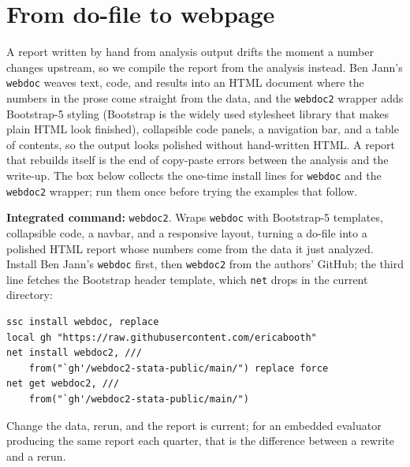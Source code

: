 \section{From do-file to webpage}
A report written by hand from analysis output drifts the moment a number changes upstream, so we compile the report from the analysis instead. Ben Jann's \texttt{webdoc} weaves text, code, and results into an HTML document where the numbers in the prose come straight from the data, and the \texttt{webdoc2} wrapper adds Bootstrap-5 styling (Bootstrap is the widely used stylesheet library that makes plain HTML look finished), collapsible code panels, a navigation bar, and a table of contents, so the output looks polished without hand-written HTML. A report that rebuilds itself is the end of copy-paste errors between the analysis and the write-up. The box below collects the one-time install lines for \texttt{webdoc} and the \texttt{webdoc2} wrapper; run them once before trying the examples that follow.

\begin{kaobox}[frametitle=Package Integration: \texttt{webdoc2}]
\textbf{Integrated command:} \texttt{webdoc2}. Wraps \texttt{webdoc} with Bootstrap-5 templates, collapsible code, a navbar, and a responsive layout, turning a do-file into a polished HTML report whose numbers come from the data it just analyzed. Install Ben Jann's \texttt{webdoc} first, then \texttt{webdoc2} from the authors' GitHub; the third line fetches the Bootstrap header template, which \texttt{net} drops in the current directory:
\par
{\footnotesize
\begin{verbatim}
ssc install webdoc, replace
local gh "https://raw.githubusercontent.com/ericabooth"
net install webdoc2, ///
    from("`gh'/webdoc2-stata-public/main/") replace force
net get webdoc2, ///
    from("`gh'/webdoc2-stata-public/main/")
\end{verbatim}
}
\end{kaobox}

Change the data, rerun, and the report is current; for an embedded evaluator producing the same report each quarter, that is the difference between a rewrite and a rerun.

